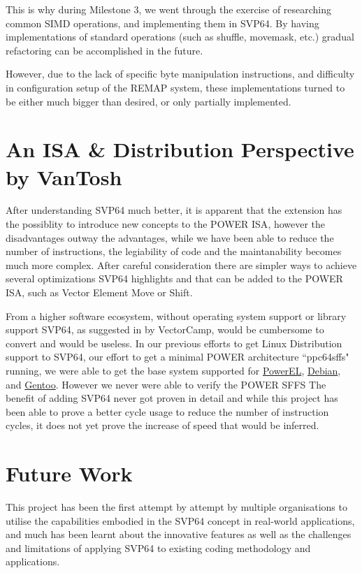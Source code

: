 This is why during Milestone 3, we went through the exercise of researching
common SIMD operations, and implementing them in SVP64. By having
implementations of standard operations (such as shuffle, movemask, etc.)
gradual refactoring can be accomplished in the future.

However, due to the lack of specific byte manipulation instructions, and
difficulty in configuration setup of the REMAP system, these implementations
turned to be either much bigger than desired, or only partially implemented.


\section{An ISA \& Distribution Perspective by VanTosh}

After understanding SVP64 much better, it is apparent that the extension has
the possiblity to introduce new concepts to the \acrshort{POWER} \acrshort{ISA},
however the disadvantages outway the advantages, while we have been able to
reduce the number of instructions, the legiability of code and the maintanability
becomes much more complex.
After careful consideration there are simpler ways to achieve several optimizations
SVP64 highlights and that can be added to the \acrshort{POWER} \acrshort{ISA},
such as Vector Element Move or Shift.

From a higher software ecosystem, without operating system support or library support
SVP64, as suggested in \label{sec:vecotorscansoftwareperspective} by VectorCamp,
would be cumbersome to convert and would be useless.
In our previous efforts to get Linux Distribution support to SVP64, our effort to
get a minimal \acrshort{POWER} architecture ``ppc64sffs" running, we were able
to get the base system supported for \href{https://www.powerel.org}{PowerEL},
\href{https://www.debian.org}{Debian}, and \href{https://gentoo.org}{Gentoo}.
However we never were able to verify the \acrshort{POWER} \acrfull{SFFS}
The benefit of adding SVP64 never got proven in detail and while this project
has been able to prove a better cycle usage to reduce the number of instruction
cycles, it does not yet prove the increase of speed that would be inferred.

\section{Future Work}

This project has been the first attempt by attempt by multiple organisations
to utilise the capabilities embodied in the SVP64 concept in real-world
applications, and much has been learnt about the innovative features as well
as the challenges and limitations of applying SVP64 to existing
coding methodology and applications.

